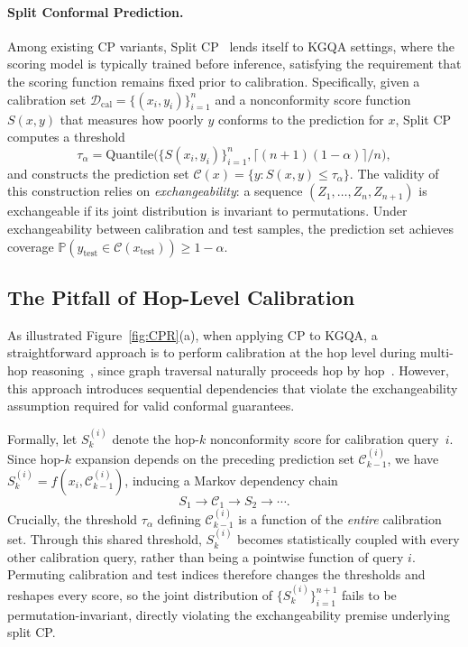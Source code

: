 \documentclass{article}
\newcommand{\jy}[1]{\textcolor{red}{[JY: #1]}}
\theoremstyle{plain}
\theoremstyle{definition}
\theoremstyle{remark}
\begin{document}
\paragraph{Split Conformal Prediction.} 
Among existing CP variants, Split CP~\citep{first_cp} lends itself to KGQA settings, where the scoring model is typically trained before inference, satisfying the requirement that the scoring function remains fixed prior to calibration. Specifically, given a calibration set $\mathcal{D}_{\mathrm{cal}}=\{(x_i,y_i)\}_{i=1}^n$ and a nonconformity score function $S(x,y)$ that measures how poorly $y$ conforms to the prediction for $x$, Split CP computes a threshold
\begin{equation}
\tau_\alpha
=
\mathrm{Quantile}\big(
\{S(x_i,y_i)\}_{i=1}^n,
\lceil (n+1)(1-\alpha)\rceil / n
\big),\nonumber
\end{equation}
and constructs the prediction set $\mathcal{C}(x)=\{y:S(x,y)\le\tau_\alpha\}$.
The validity of this construction relies on \emph{exchangeability}: a sequence $(Z_1, \dots, Z_n, Z_{n+1})$ is exchangeable if its joint distribution is invariant to permutations. Under exchangeability between calibration and test samples, the prediction set achieves coverage $\mathbb{P}(y_{\mathrm{test}} \in \mathcal{C}(x_{\mathrm{test}})) \geq 1-\alpha$.

\subsection{The Pitfall of Hop-Level Calibration}
\label{sec:challenge}
As illustrated Figure~\ref{fig:CPR}(a), when applying CP to KGQA, a straightforward approach is to perform calibration at the hop level during multi-hop reasoning~\cite{Ni_Wang_Cheng_Blasch_Derr_2025}, since graph traversal naturally proceeds hop by hop~\cite{xiong-etal-2017-deeppath}. However, this approach introduces sequential dependencies that violate the exchangeability assumption required for valid conformal guarantees.

Formally, let $S_k^{(i)}$ denote the hop-$k$ nonconformity score for calibration query~$i$. Since hop-$k$ expansion depends on the preceding prediction set $\mathcal{C}_{k-1}^{(i)}$, we have $S_k^{(i)} = f(x_i, \mathcal{C}_{k-1}^{(i)})$, inducing a Markov dependency chain 
$$S_1 \to \mathcal{C}_1 \to S_2 \to \cdots.$$
Crucially, the threshold $\tau_\alpha$ defining $\mathcal{C}_{k-1}^{(i)}$ is a function of the \emph{entire} calibration set. Through this shared threshold, $S_k^{(i)}$ becomes statistically coupled with every other calibration query, rather than being a pointwise function of query $i$. Permuting calibration and test indices therefore changes the thresholds and reshapes every score, so the joint distribution of $\{S_k^{(i)}\}_{i=1}^{n+1}$ fails to be permutation-invariant, directly violating the exchangeability premise underlying split CP.
\end{document}
